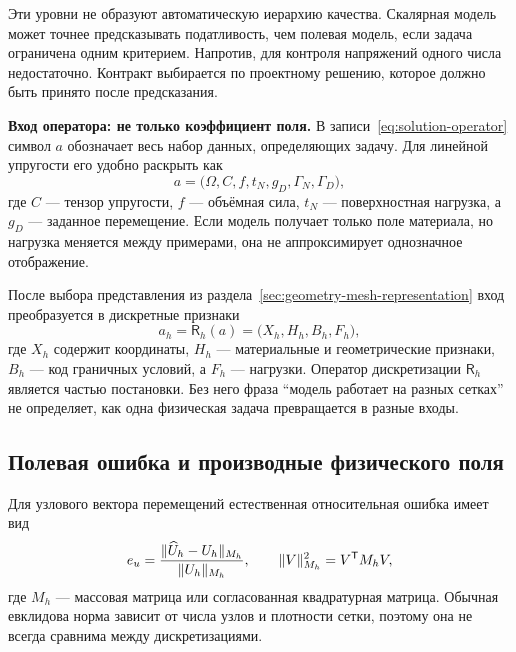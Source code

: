 Эти уровни не образуют автоматическую иерархию качества. Скалярная модель может точнее предсказывать податливость, чем полевая модель, если задача ограничена одним критерием. Напротив, для контроля напряжений одного числа недостаточно. Контракт выбирается по проектному решению, которое должно быть принято после предсказания.

\medskip
\noindent\textbf{Вход оператора: не только коэффициент поля.}
В записи~\eqref{eq:solution-operator} символ $a$ обозначает весь набор данных, определяющих задачу. Для линейной упругости его удобно раскрыть как
\begin{equation}
 a
 =
 \bigl(
  \Omega,
  C,
  f,
  t_N,
  g_D,
  \Gamma_N,
  \Gamma_D
 \bigr),
\end{equation}
где $C$ --- тензор упругости, $f$ --- объёмная сила, $t_N$ --- поверхностная нагрузка, а $g_D$ --- заданное перемещение. Если модель получает только поле материала, но нагрузка меняется между примерами, она не аппроксимирует однозначное отображение.

После выбора представления из раздела~\ref{sec:geometry-mesh-representation} вход преобразуется в дискретные признаки
\begin{equation}
 a_h
 =
 \mathsf R_h(a)
 =
 \bigl(X_h,H_h,B_h,F_h\bigr),
\end{equation}
где $X_h$ содержит координаты, $H_h$ --- материальные и геометрические признаки, $B_h$ --- код граничных условий, а $F_h$ --- нагрузки. Оператор дискретизации $\mathsf R_h$ является частью постановки. Без него фраза ``модель работает на разных сетках'' не определяет, как одна физическая задача превращается в разные входы.

\subsection{Полевая ошибка и производные физического поля}
Для узлового вектора перемещений естественная относительная ошибка имеет вид
\begin{equation}
 e_u
 =
 \frac{\lVert\widehat U_h-U_h\rVert_{M_h}}
      {\lVert U_h\rVert_{M_h}},
 \qquad
 \lVert V\rVert_{M_h}^2=V^{\mathsf{T}}M_hV,
\end{equation}
где $M_h$ --- массовая матрица или согласованная квадратурная матрица. Обычная евклидова норма зависит от числа узлов и плотности сетки, поэтому она не всегда сравнима между дискретизациями.

